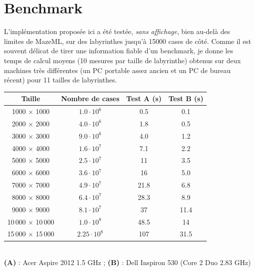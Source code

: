 \documentclass[11pt]{article}
\begin{document}
    \section{Benchmark}

    L'implémentation proposée ici a été testée, \emph{sans affichage}, bien 
  au-delà des limites de MazeML, sur des labyrinthes jusqu'à 15000 cases de 
  côté. Comme il est souvent délicat de tirer une information fiable d'un 
  benchmark, je donne les temps de calcul moyens (10 mesures par taille de 
  labyrinthe) obtenus sur deux machines très différentes (un PC portable assez 
  ancien et un PC de bureau récent) pour 11 tailles de labyrinthes.

  \begin{table}[!ht]
    \centering\sffamily
    \begin{tabular}{|c|c|c|c|}
                                                                          \hline
      \textbf{Taille} & \textbf{Nombre de cases} & \textbf{Test A} (s) 
      & \textbf{Test B} (s)                                             \\\hline
      1000 $\times$ 1000        & $1.0 \cdot 10^6$  & 0.5    &	0.1     \\\hline
      2000 $\times$ 2000        & $4.0 \cdot 10^6$  & 1.8    &	0.5     \\\hline
      3000 $\times$ 3000        & $9.0 \cdot 10^6$  & 4.0    &	1.2     \\\hline
      4000 $\times$ 4000        & $1.6\cdot 10^7$   & 7.1    &	2.2     \\\hline
      5000 $\times$ 5000        & $2.5\cdot 10^7$   & 11     &	3.5     \\\hline
      6000 $\times$ 6000        & $3.6\cdot 10^7$   & 16     &	5.0     \\\hline
      7000 $\times$ 7000        & $4.9\cdot 10^7$   & 21.8   &	6.8     \\\hline
      8000 $\times$ 8000        & $6.4\cdot 10^7$   & 28.3   & 8.9      \\\hline
      9000 $\times$ 9000        & $8.1\cdot 10^7$   & 37     & 11.4     \\\hline
      10\,000 $\times$ 10\,000  & $1.0 \cdot 10^8$  & 48.5   &	14      \\\hline
      15\,000 $\times$ 15\,000  & $2.25\cdot 10^8$  & 	107  &	31.5    \\\hline
    \end{tabular}\\
    \vspace{3mm}\centering\small
    \textbf{(A)} : Acer Aspire 2012 1.5 GHz ;
    \textbf{(B)} : Dell Inspiron 530 (Core 2 Duo 2.83 GHz)
  \end{table}
\end{document}
